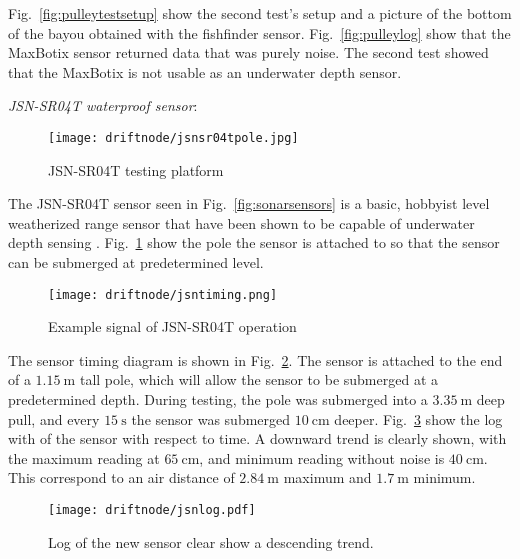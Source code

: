 Fig.~\ref{fig:pulleytestsetup} show the second test's setup and a picture of the bottom of the bayou obtained with the fishfinder sensor.
Fig.~\ref{fig:pulleylog} show that the MaxBotix sensor returned data that was purely noise.
The second test showed that the MaxBotix is not usable as an underwater depth sensor.

\noindent  \emph{JSN-SR04T waterproof sensor}:

\begin{figure}[h]
	\begin{center}
	\texttt{[image: driftnode/jsnsr04tpole.jpg]}
	\caption[JSN-SR04T]{
		JSN-SR04T testing platform
	} \label{fig:jsnsr04t}
	\end{center}
	\vspace{-1em}
\end{figure}
The JSN-SR04T sensor seen in Fig.~\ref{fig:sonarsensors} is a basic, hobbyist level weatherized range sensor that have been shown to be capable of underwater depth sensing \cite{bakarsonar}. Fig.~\ref{fig:jsnsr04t} show the pole the sensor is attached to so that the sensor can be submerged at predetermined level.
\begin{figure}[h]
	\begin{center}
	\texttt{[image: driftnode/jsntiming.png]}
	\caption[JSN-SR04T Timing]{
		Example signal of JSN-SR04T operation
	} \label{fig:jsntiming}
	\end{center}
	\vspace{-1em}
\end{figure}
The sensor timing diagram is shown in Fig.~\ref{fig:jsntiming}.
The sensor is attached to the end of a $\SI{1.15}{\metre}$ tall pole, which will allow the sensor to be submerged at a predetermined depth.
During testing, the pole was submerged into a $\SI{3.35}{\metre}$ deep pull, and every $\SI{15}{\second}$ the sensor was submerged $\SI{10}{\centi\metre}$ deeper.
Fig.~\ref{fig:jsnlog} show the log with of the sensor with respect to time.
A downward trend is clearly shown, with the maximum reading at $\SI{65}{\centi\metre}$, and minimum reading without noise is $\SI{40}{\centi\metre}$.
This correspond to an air distance of $\SI{2.84}{\metre}$ maximum and $\SI{1.7}{\metre}$ minimum.

\begin{figure}[h]
	\begin{center}
	\texttt{[image: driftnode/jsnlog.pdf]}
	\caption[JSN-SR04T sensor log]{
		Log of the new sensor clear show a descending trend.
	} \label{fig:jsnlog}
	\end{center}
	\vspace{-1em}
\end{figure}
